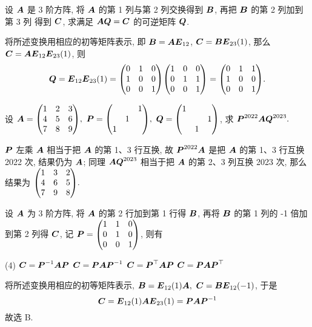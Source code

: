 \begin{example}
    设 $\vb*{A}$ 是 3 阶方阵, 将 $\vb*{A}$ 的第 1 列与第 2 列交换得到 $\vb*{B}$, 再把 $\vb*{B}$ 的第 2 列加到第 3 列 得到 $\vb*{C}$, 求满足 $\vb*{AQ}=\vb*{C}$ 的可逆矩阵 $\vb*{Q}$.
\end{example}
\begin{solution}
    将所述变换用相应的初等矩阵表示, 即 $\vb*{B}=\vb*{AE}_{12}$, $\vb*{C}=\vb*{BE}_{23}(1)$, 那么 $\vb*{C}=\vb*{AE}_{12}\vb*{E}_{23}(1)$, 则
    $$\vb*{Q}=\vb*{E}_{12}\vb*{E}_{23}(1)=\mqty(0&1&0\\1&0&0\\0&0&1)\mqty(1&0&0\\0&1&1\\0&0&1)=\mqty(0&1&1\\1&0&0\\0&0&1).$$
\end{solution}

\begin{example}
    设 $\vb*{A}=\mqty(1&2&3\\4&5&6\\7&8&9),~\vb*{P}=\mqty(\admat{1,1,1}),~\vb*{Q}=\mqty(1&&\\&&1\\&1&)$, 求 $\vb*{P}^{2022}\vb*{AQ}^{2023}.$
\end{example}
\begin{solution}
    $\vb*{P}$ 左乘 $\vb*{A}$ 相当于把 $\vb*{A}$ 的第 1、3 行互换, 故 $\vb*{P}^{2022}\vb*{A}$ 是把 $\vb*{A}$ 的第 1、3 行互换 2022 次, 结果仍为 $\vb*{A}$;
    同理 $\vb*{AQ}^{2023}$ 相当于把 $\vb*{A}$ 的第 2、3 列互换 2023 次, 那么结果为 $\mqty(1&3&2\\4&6&5\\7&9&8).$
\end{solution}

\begin{example}[2006 数一]
    设 $\vb*{A}$ 为 3 阶方阵, 将 $\vb*{A}$ 的第 2 行加到第 1 行得 $\vb*{B}$, 再将 $\vb*{B}$ 的第 1 列的 -1 倍加到第 2 列得 $\vb*{C}$, 记 $\vb*{P}=\mqty(1&1&0\\0&1&0\\0&0&1)$, 则有
    \begin{tasks}(4)
        \task $\vb*{C}=\vb*{P}^{-1}\vb*{AP}$
        \task $\vb*{C}=\vb*{PAP}^{-1}$
        \task $\vb*{C}=\vb*{P}^\top\vb*{AP}$
        \task $\vb*{C}=\vb*{PAP}^\top$
    \end{tasks}
\end{example}
\begin{solution}
    将所述变换用相应的初等矩阵表示, $\vb*{B}=\vb*{E}_{12}(1)\vb*{A},~\vb*{C}=\vb*{BE}_{12}(-1)$, 于是 $$\vb*{C}=\vb*{E}_{12}(1)\vb*{A}\vb*{E}_{23}(1)=\vb*{PAP}^{-1}$$
    故选 B.
\end{solution}

